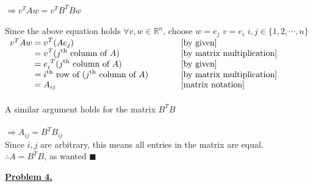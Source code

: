 \documentclass[12pt]{article}
\newcommand{\R}{\mathbb{R}}
\renewcommand{\qed}{\hfill$\blacksquare$}
\begin{document}
\\\\
$\Longrightarrow v^T A w =v^T B^T Bw$
\\\\
\noindent Since the above equation holds $\forall v, w \in \R^n$, choose $w = e_j$ \qquad $v = e_i$ \qquad $i,j \in \{1,2,\cdots, n\}$\\
{$\begin{array}{r@{}>{\displaystyle}ll}
		v^TAw & {}= v^T (A e_j)                                                                    & [\text{by given}]                 \\
		      & {}= v^T (j^{\text{th}}\text{ column of }A)                                         & [\text{by matrix multiplication}] \\
		      & {}= e_i^{\ T} (j^{\text{th}}\text{ column of }A)                                   & [\text{by given}]                 \\
		      & {}= i^{\text{th}}\text{ row of } (j^{\text{th}}\text{ column of }A) \hspace*{10mm} & [\text{by matrix multiplication}] \\
		      & {}= A_{ij}                                                                         & [\text{matrix notation}]          \\
	\end{array}$}
\\\\
A similar argument holds for the matrix $B^TB$
\\\\
$\Longrightarrow A_{ij} = B^TB_{ij}$\\
Since $i,j$ are arbitrary, this means all entries in the matrix are equal.\\
$\therefore A = B^TB$, as wanted \qed



\newpage
{\LARGE \noindent \underline{\textbf{Problem 4.}}}\\
\end{document}
